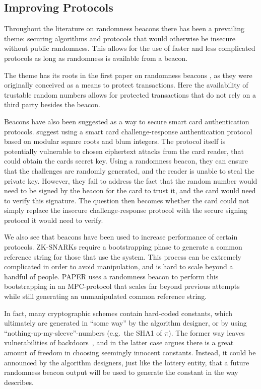 \subsection{Improving Protocols}
Throughout the literature on randomness beacons there has been a prevailing theme: securing algorithms and protocols that would otherwise be insecure without public randomness. This allows for the use of faster and less complicated protocols as long as randomness is available from a beacon.

The theme has its roots in the first paper on randomness beacons \cite{rabin1983transaction}, as they were originally conceived as a means to protect transactions. Here the availability of trustable random numbers allows for protected transactions that do not rely on a third party besides the beacon.

Beacons have also been suggested as a way to secure smart card authentication protocols. \citet{fischer2011publicrandomnessservice} suggest using a smart card challenge-response authentication protocol based on modular square roots and blum integers. The protocol itself is potentially vulnerable to chosen ciphertext attacks from the card reader, that could obtain the cards secret key. Using a randomness beacon, they can ensure that the challenges are randomly generated, and the reader is unable to steal the private key. However, they fail to address the fact that the random number would need to be signed by the beacon for the card to trust it, and the card would need to verify this signature. The question then becomes whether the card could not simply replace the insecure challenge-response protocol with the secure signing protocol it would need to verify.

We also see that beacons have been used to increase performance of certain protocols. ZK-SNARKs require a bootstrapping phase to generate a common reference string for those that use the system. This process can be extremely complicated in order to avoid manipulation, and is hard to scale beyond a handful of people. PAPER uses a randomness beacon to perform this bootstrapping in an MPC-protocol that scales far beyond previous attempts while still generating an unmanipulated common reference string.

In fact, many cryptographic schemes contain hard-coded constants, which ultimately are generated in \enquote{some way} by the algorithm designer, or by using \enquote{nothing-up-my-sleeve}-numbers (e.g.\ the SHA1 of $\pi$).
The former way leaves vulnerabilities of backdoors~, and in the latter case  argues there is a great amount of freedom in choosing seemingly innocent constants.
Instead, it could be announced by the algorithm designers, just like the lottery entity, that a future randomness beacon output will be used to generate the constant in the way  describes.